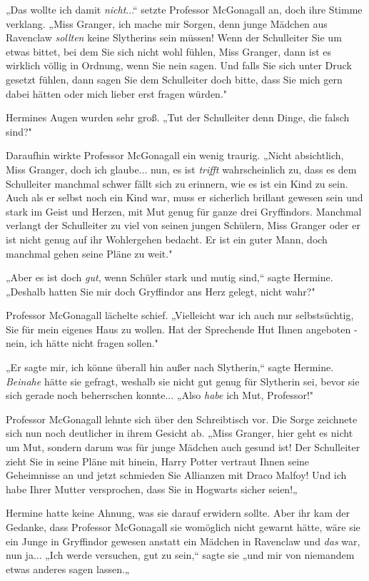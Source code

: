 {„Das wollte ich damit \emph{nicht}...“ setzte Professor McGonagall an, doch ihre Stimme verklang. „Miss Granger, ich mache mir Sorgen, denn junge Mädchen aus Ravenclaw \emph{sollten} keine Slytherins sein müssen! Wenn der Schulleiter Sie um etwas bittet, bei dem Sie sich nicht wohl fühlen, Miss Granger, dann ist es wirklich völlig in Ordnung, wenn Sie nein sagen. Und falls Sie sich unter Druck gesetzt fühlen, dann sagen Sie dem Schulleiter doch bitte, dass Sie mich gern dabei hätten oder mich lieber erst fragen würden."

Hermines Augen wurden sehr groß. „Tut der Schulleiter denn Dinge, die falsch sind?"

Daraufhin wirkte Professor McGonagall ein wenig traurig. „Nicht absichtlich, Miss Granger, doch ich glaube... nun, es ist \emph{trifft} wahrscheinlich zu, dass es dem Schulleiter manchmal schwer fällt sich zu erinnern, wie es ist ein Kind zu sein. Auch als er selbst noch ein Kind war, muss er sicherlich brillant gewesen sein und stark im Geist und Herzen, mit Mut genug für ganze drei Gryffindors. Manchmal verlangt der Schulleiter zu viel von seinen jungen Schülern, Miss Granger oder er ist nicht genug auf ihr Wohlergehen bedacht. Er ist ein guter Mann, doch manchmal gehen seine Pläne zu weit."

„Aber es ist doch \emph{gut}, wenn Schüler stark und mutig sind,“ sagte Hermine. „Deshalb hatten Sie mir doch Gryffindor ans Herz gelegt, nicht wahr?"

Professor McGonagall lächelte schief. „Vielleicht war ich auch nur selbstsüchtig, Sie für mein eigenes Haus zu wollen. Hat der Sprechende Hut Ihnen angeboten - nein, ich hätte nicht fragen sollen."

„Er sagte mir, ich könne überall hin außer nach Slytherin,“ sagte Hermine. \emph{Beinahe} hätte sie gefragt, weshalb sie nicht gut genug für Slytherin sei, bevor sie sich gerade noch beherrschen konnte... „Also \emph{habe} ich Mut, Professor!"

Professor McGonagall lehnte sich über den Schreibtisch vor. Die Sorge zeichnete sich nun noch deutlicher in ihrem Gesicht ab. „Miss Granger, hier geht es nicht um Mut, sondern darum was für junge Mädchen auch gesund ist! Der Schulleiter zieht Sie in seine Pläne mit hinein, Harry Potter vertraut Ihnen seine Geheimnisse an und jetzt schmieden Sie Allianzen mit Draco Malfoy! Und ich habe Ihrer Mutter versprochen, dass Sie in Hogwarts sicher seien!„

Hermine hatte keine Ahnung, was sie darauf erwidern sollte. Aber ihr kam der Gedanke, dass Professor McGonagall sie womöglich nicht gewarnt hätte, wäre sie ein Junge in Gryffindor gewesen anstatt ein Mädchen in Ravenclaw und \emph{das} war, nun ja... „Ich werde versuchen, gut zu sein,“ sagte sie „und mir von niemandem etwas anderes sagen lassen.„

}
